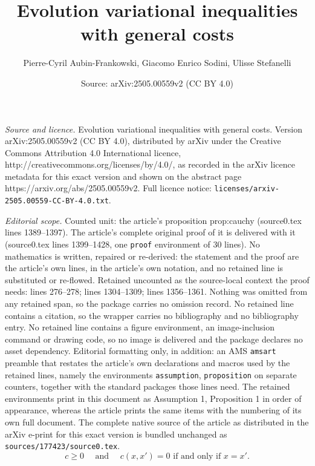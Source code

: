 \documentclass[10pt,a4paper]{amsart}
\title{Evolution variational inequalities with general costs}
\author{Pierre-Cyril Aubin-Frankowski, Giacomo Enrico Sodini, Ulisse Stefanelli}
\date{Source: arXiv:2505.00559v2 (CC BY 4.0)}
\begin{document}
\maketitle

\noindent\emph{Source and licence.} Evolution variational inequalities with general costs. Version arXiv:2505.00559v2 (CC BY 4.0), distributed by arXiv under the Creative Commons Attribution 4.0 International licence, http://creativecommons.org/licenses/by/4.0/, as recorded in the arXiv licence metadata for this exact version and shown on the abstract page https://arxiv.org/abs/2505.00559v2. Full licence notice: \texttt{licenses/arxiv-2505.00559-CC-BY-4.0.txt}.\par\smallskip

\noindent\textit{Editorial scope.} Counted unit: the article's proposition prop:cauchy (source0.tex lines 1389--1397). The article's complete original proof of it is delivered with it (source0.tex lines 1399--1428, one \texttt{proof} environment of 30 lines). No mathematics is written, repaired or re-derived: the statement and the proof are the article's own lines, in the article's own notation, and no retained line is substituted or re-flowed.  Retained uncounted as the source-local context the proof needs: lines 276--278; lines 1304--1309; lines 1356--1361.  Nothing was omitted from any retained span, so the package carries no omission record.  No retained line contains a citation, so the wrapper carries no bibliography and no bibliography entry.  No retained line contains a figure environment, an image-inclusion command or drawing code, so no image is delivered and the package declares no asset dependency.  Editorial formatting only, in addition: an AMS \texttt{amsart} preamble that restates the article's own declarations and macros used by the retained lines, namely the environments \texttt{assumption}, \texttt{proposition} on separate counters, together with the standard packages those lines need.  The retained environments print in this document as Assumption 1, Proposition 1 in order of appearance, whereas the article prints the same items with the numbering of its own full document.  The complete native source of the article as distributed in the arXiv e-print for this exact version is bundled unchanged as \texttt{sources/177423/source0.tex}.
    \begin{equation}\label{eq:addass}\tag{Diss}
     c \ge 0 \quad \text{ and } \quad c(x,x')=0 \text{ if and only if } x=x'.
    \end{equation}
\end{document}
